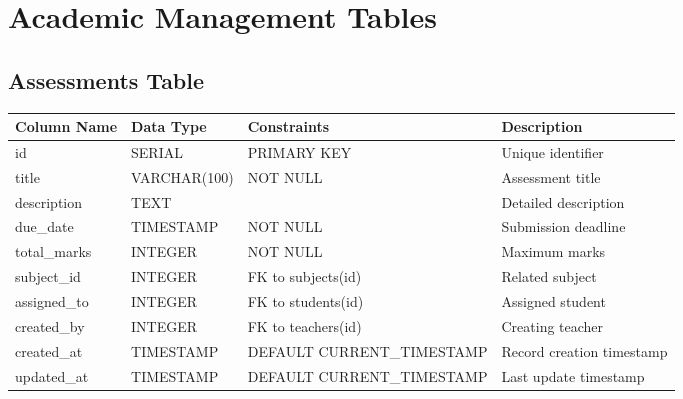 \documentclass[11pt,a4paper]{article}
\begin{document}
\section{Academic Management Tables}

\subsection{Assessments Table}
\begin{longtable}{|p{3.5cm}|p{2.5cm}|p{3cm}|p{5.5cm}|}
\hline
\textbf{Column Name} & \textbf{Data Type} & \textbf{Constraints} & \textbf{Description} \\
\hline
\endhead
id & SERIAL & PRIMARY KEY & Unique identifier \\
\hline
title & VARCHAR(100) & NOT NULL & Assessment title \\
\hline
description & TEXT & & Detailed description \\
\hline
due\_date & TIMESTAMP & NOT NULL & Submission deadline \\
\hline
total\_marks & INTEGER & NOT NULL & Maximum marks \\
\hline
subject\_id & INTEGER & FK to subjects(id) & Related subject \\
\hline
assigned\_to & INTEGER & FK to students(id) & Assigned student \\
\hline
created\_by & INTEGER & FK to teachers(id) & Creating teacher \\
\hline
created\_at & TIMESTAMP & DEFAULT CURRENT\_TIMESTAMP & Record creation timestamp \\
\hline
updated\_at & TIMESTAMP & DEFAULT CURRENT\_TIMESTAMP & Last update timestamp \\
\hline
\end{longtable}
\end{document}
